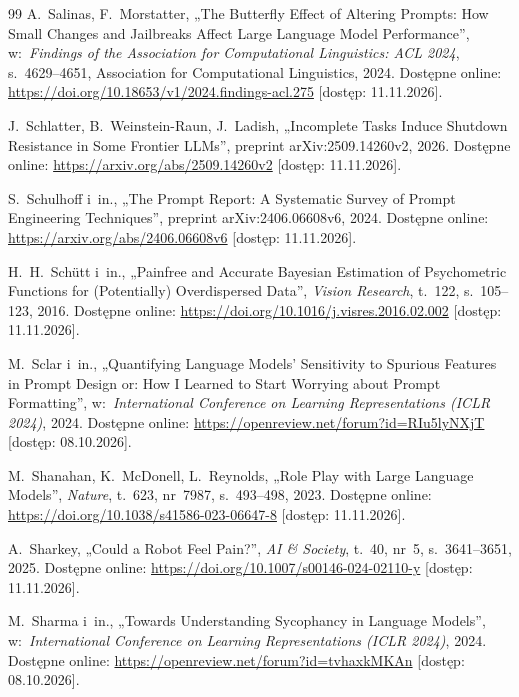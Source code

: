 \begin{thebibliography}{99}
 A.~Salinas, F.~Morstatter, „The Butterfly Effect of Altering Prompts: How Small Changes and Jailbreaks Affect Large Language Model Performance”, w:~\textit{Findings of the Association for Computational Linguistics: ACL 2024}, s.~4629--4651, Association for Computational Linguistics, 2024. Dostępne online: \url{https://doi.org/10.18653/v1/2024.findings-acl.275} [dostęp: 11.11.2026].

 J.~Schlatter, B.~Weinstein-Raun, J.~Ladish, „Incomplete Tasks Induce Shutdown Resistance in Some Frontier {LLMs}”, preprint arXiv:2509.14260v2, 2026. Dostępne online: \url{https://arxiv.org/abs/2509.14260v2} [dostęp: 11.11.2026].

 S.~Schulhoff i~in., „The Prompt Report: A Systematic Survey of Prompt Engineering Techniques”, preprint arXiv:2406.06608v6, 2024. Dostępne online: \url{https://arxiv.org/abs/2406.06608v6} [dostęp: 11.11.2026].

 H.~H.~Schütt i~in., „Painfree and Accurate {Bayesian} Estimation of Psychometric Functions for (Potentially) Overdispersed Data”, \textit{Vision Research}, t.~122, s.~105--123, 2016. Dostępne online: \url{https://doi.org/10.1016/j.visres.2016.02.002} [dostęp: 11.11.2026].

 M.~Sclar i~in., „Quantifying Language Models' Sensitivity to Spurious Features in Prompt Design or: How {I} Learned to Start Worrying about Prompt Formatting”, w:~\textit{International Conference on Learning Representations (ICLR 2024)}, 2024. Dostępne online: \url{https://openreview.net/forum?id=RIu5lyNXjT} [dostęp: 08.10.2026].

 M.~Shanahan, K.~McDonell, L.~Reynolds, „Role Play with Large Language Models”, \textit{Nature}, t.~623, nr~7987, s.~493--498, 2023. Dostępne online: \url{https://doi.org/10.1038/s41586-023-06647-8} [dostęp: 11.11.2026].

 A.~Sharkey, „Could a Robot Feel Pain?”, \textit{AI \& Society}, t.~40, nr~5, s.~3641--3651, 2025. Dostępne online: \url{https://doi.org/10.1007/s00146-024-02110-y} [dostęp: 11.11.2026].

 M.~Sharma i~in., „Towards Understanding Sycophancy in Language Models”, w:~\textit{International Conference on Learning Representations (ICLR 2024)}, 2024. Dostępne online: \url{https://openreview.net/forum?id=tvhaxkMKAn} [dostęp: 08.10.2026].


\end{thebibliography}
